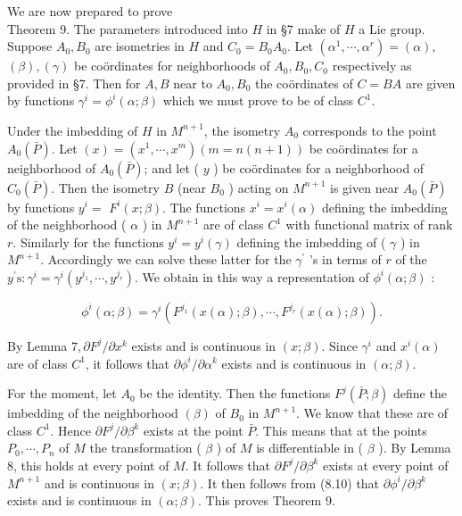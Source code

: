 \documentclass[10pt]{article}
\begin{document}
We are now prepared to prove\\
Theorem 9. The parameters introduced into $H$ in §7 make of $H$ a Lie group.\\
Suppose $A_{0}, B_{0}$ are isometries in $H$ and $C_{0}=B_{0} A_{0}$. Let $\left(\alpha^{1}, \cdots, \alpha^{r}\right)=(\alpha)$, $(\beta),(\gamma)$ be coördinates for neighborhoods of $A_{0}, B_{0}, C_{0}$ respectively as provided in §7. Then for $A, B$ near to $A_{0}, B_{0}$ the coördinates of $C=B A$ are given by functions $\gamma^{i}=\phi^{i}(\alpha ; \beta)$ which we must prove to be of class $C^{1}$.

Under the imbedding of $H$ in $M^{n+1}$, the isometry $A_{0}$ corresponds to the point $A_{0}(\bar{P})$. Let $(x)=\left(x^{1}, \cdots, x^{m}\right)(m=n(n+1))$ be coördinates for a neighborhood of $A_{0}(\bar{P})$; and let ( $y$ ) be coördinates for a neighborhood of $C_{0}(\bar{P})$. Then the isometry $B$ (near $B_{0}$ ) acting on $M^{n+1}$ is given near $A_{0}(\bar{P})$ by functions $y^{i}=$ $F^{i}(x ; \beta)$. The functions $x^{i}=x^{i}(\alpha)$ defining the imbedding of the neighborhood ( $\alpha$ ) in $M^{n+1}$ are of class $C^{1}$ with functional matrix of rank $r$. Similarly for the functions $y^{i}=y^{i}(\gamma)$ defining the imbedding of ( $\gamma$ ) in $M^{n+1}$. Accordingly we can solve these latter for the $\gamma^{\prime}$ 's in terms of $r$ of the $y^{\prime} \mathrm{s}: \gamma^{i}=\gamma^{i}\left(y^{j_{1}}, \cdots, y^{j_{r}}\right)$. We obtain in this way a representation of $\phi^{i}(\alpha ; \beta)$ :


\begin{equation*}
\phi^{i}(\alpha ; \beta)=\gamma^{i}\left(F^{j_{1}}(x(\alpha) ; \beta), \cdots, F^{j_{r}}(x(\alpha) ; \beta)\right) . \tag{8.10}
\end{equation*}


By Lemma $7, \partial F^{j} / \partial x^{k}$ exists and is continuous in $(x ; \beta)$. Since $\gamma^{i}$ and $x^{i}(\alpha)$ are of class $C^{1}$, it follows that $\partial \phi^{i} / \partial \alpha^{k}$ exists and is continuous in $(\alpha ; \beta)$.

For the moment, let $A_{0}$ be the identity. Then the functions $F^{j}(\bar{P} ; \beta)$ define the imbedding of the neighborhood $(\beta)$ of $B_{0}$ in $M^{n+1}$. We know that these are of class $C^{1}$. Hence $\partial F^{j} / \partial \beta^{k}$ exists at the point $\bar{P}$. This means that at the points $P_{0}, \cdots, P_{n}$ of $M$ the transformation ( $\beta$ ) of $M$ is differentiable in ( $\beta$ ). By Lemma 8, this holds at every point of $M$. It follows that $\partial F^{j} / \partial \beta^{k}$ exists at every point of $M^{n+1}$ and is continuous in $(x ; \beta)$. It then follows from (8.10) that $\partial \phi^{i} / \partial \beta^{k}$ exists and is continuous in $(\alpha ; \beta)$. This proves Theorem 9.
\end{document}
